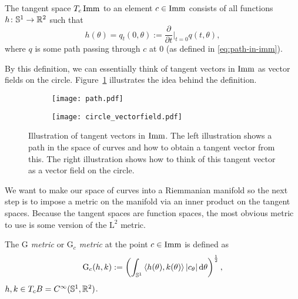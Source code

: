\begin{definition}
  \label{def:tangt-space-of-curves}
  The tangent space $T_{c}\mathop{}\!\mathrm{Imm}$ to an element $c \in \mathop{}\!\mathrm{Imm}$ consists of all functions
  $h\colon \mathbb{S}^1 \rightarrow \mathbb{R}^2$ such that
  \begin{equation*}
    h(\theta) = q_t(0, \theta) := \frac{\partial }{\partial t} \bigg\vert_{t=0} q(t,\theta),
  \end{equation*}
  where $q$ is some path passing through $c$ at 0 (as defined in \eqref{eq:path-in-imm}).
\end{definition}

By this definition, we can essentially think of tangent vectors in $\mathop{}\!\mathrm{Imm}$ as vector fields on the circle. Figure~\ref{fig:def-tang-imm} illustrates the idea behind the definition.

\begin{figure}
  \centering
  \begin{subfigure}{.49\textwidth}
    \centering
    \texttt{[image: path.pdf]}
  \end{subfigure}
  \begin{subfigure}{.49\textwidth}
    \centering
    \texttt{[image: circle\_vectorfield.pdf]}
  \end{subfigure}
  \caption{Illustration of tangent vectors in $\mathop{}\!\mathrm{Imm}$. The left illustration shows a path in the space of curves and how to obtain a tangent vector from this. The right illustration shows how to think of this tangent vector as a vector field on the circle.}
  \label{fig:def-tang-imm}
\end{figure}

We want to make our space of curves into a Riemmanian manifold so the next step is to impose a metric on the manifold via an inner product on the tangent spaces. Because the tangent spaces are function spaces, the most obvious metric to use is some version of the $\mathrm{L}^2$ metric.

\begin{definition}
  The \textit{$\mathrm{G}$ metric} or \textit{$\mathrm{G}_c$ metric} at the point $c \in \mathop{}\!\mathrm{Imm}$ is defined as
  \begin{equation*}
    \mathrm{G}_c(h,k) :=
    \left(
      \int_{\mathbb{S}^{1}} \left\langle{h(\theta)
          , k(\theta)}\right\rangle |c_{\theta}| \mathop{}\!\mathrm{d} \theta
    \right)^{\frac{1}{2}},
  \end{equation*}
  $h,k \in T_cB = C^{\infty}(\mathbb{S}^1,\mathbb{R}^2)$.
\end{definition}

